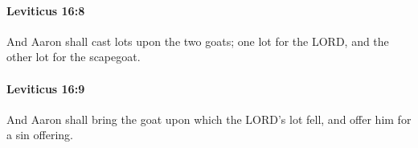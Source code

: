 		\paragraph{Leviticus 16:8} %
			\label{LEVITICUS-16-8}

			And Aaron shall cast lots upon the two goats; one lot for the LORD, and the other lot for the scapegoat.


		\paragraph{Leviticus 16:9} %
			\label{LEVITICUS-16-9}

			And Aaron shall bring the goat upon which the LORD’s lot fell, and offer him for a sin offering.


